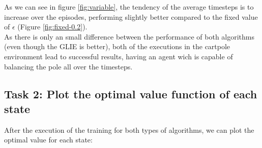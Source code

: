 \documentclass[12pt]{article}
\begin{document}
As we can see in figure \ref{fig:variable}, the tendency of the average timesteps is to increase over the episodes, performing slightly better compared to the fixed value of $\epsilon$ (Figure \ref{fig:fixed-0.2}). \\

As there is only an small difference between the performance of both algorithms (even though the GLIE is better), both of the executions in the cartpole environment lead to successful results, having an agent wich is capable of balancing the pole all over the timesteps.

\subsection{Task 2: Plot the optimal value function of each state}

After the execution of the training for both types of algorithms, we can plot the optimal value for each state:
\end{document}
